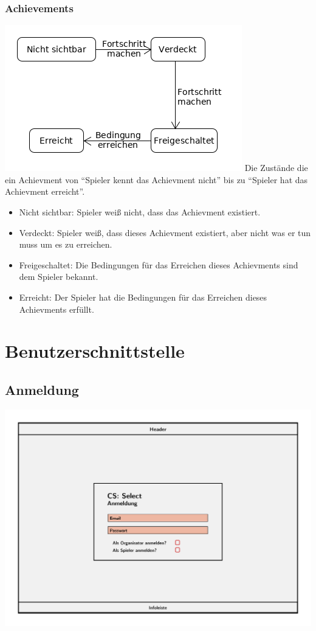 \documentclass[a4paper]{scrreprt}
\begin{document}
    \subsection{Achievements}
    \label{fig:Achievment_State}
    \includegraphics[width=\textwidth]{uml/export/Achievment_State.png}
    Die Zustände die ein Achievment von \enquote{Spieler kennt das Achievment nicht} bis zu \enquote{Spieler hat das Achievment erreicht}.
    \begin{itemize}
    \item Nicht sichtbar: Spieler weiß nicht, dass das Achievment existiert.
    \item Verdeckt: Spieler weiß, dass dieses Achievment existiert, aber nicht was er tun muss um es zu erreichen.
    \item Freigeschaltet: Die Bedingungen für das Erreichen dieses Achievments sind dem Spieler bekannt.
    \item Erreicht: Der Spieler hat die Bedingungen für das Erreichen dieses Achievments erfüllt.
    \end{itemize}
    

    \chapter{Benutzerschnittstelle}

    \section{Anmeldung}
    \centering
    \includegraphics[width=\textwidth]{../pictures/Anmeldung.jpg}
\end{document}
